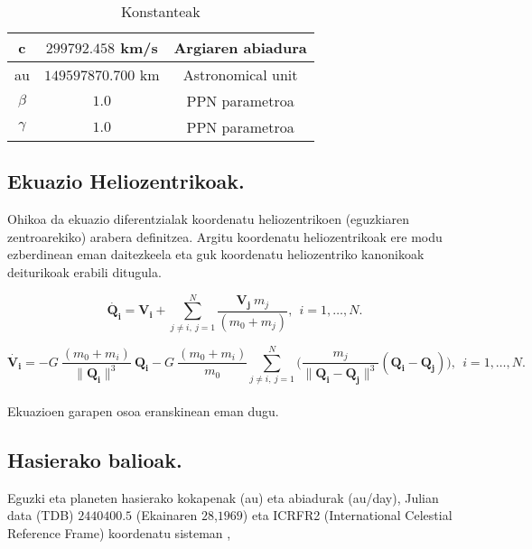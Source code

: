 \begin{table}[h]
\caption{Konstanteak}
\label{tab:1}       %
\centering
\begin{tabular}{ c c c }
\hline
  c             &  $299792.458$ km/s           & Argiaren abiadura  \\
\hline
  au            &  $149597870.700$ km           & Astronomical unit  \\
\hline 	       
$\beta$          & $1.0$                       & PPN parametroa     \\
\hline 
$\gamma$         & $1.0$                       & PPN parametroa     \\
\hline
\end{tabular}
\end{table}


\subsection{Ekuazio Heliozentrikoak.}

Ohikoa da ekuazio diferentzialak koordenatu heliozentrikoen (eguzkiaren zentroarekiko) arabera definitzea. Argitu koordenatu heliozentrikoak ere modu ezberdinean eman daitezkeela eta guk koordenatu heliozentriko kanonikoak deiturikoak erabili ditugula.

\begin{equation*}
\dot{\mathbf{Q_i}}=\mathbf{V_i}+ \sum\limits_{j\ne i,\ j=1}^{N} \frac{\mathbf{V_j} \ m_j}{(m_0+m_j)}, \ \ i=1,\dots, N.
\end{equation*}
   
\begin{equation*}
\dot{\mathbf{V_i}}=- G  \ \frac{(m_0+m_i)}{\|\mathbf{Q_i}\|^3 }\ \mathbf{Q_i}-G \ \frac{(m_0+m_i)}{m_0}
                    \sum\limits_{j \ne i , \ j=1}^{N} \bigg( \frac{m_j}{\|\mathbf{Q_i}-\mathbf{Q_j}\|^3} (\mathbf{Q_i-\mathbf{Q_j}})     \bigg), \ \ i=1,\dots, N.
\end{equation*}

\paragraph*{} Ekuazioen garapen osoa eranskinean eman dugu.

\subsection{Hasierako balioak.}

Eguzki eta planeten hasierako kokapenak (au) eta abiadurak (au/day), Julian data (TDB) $2440400.5$ (Ekainaren $28$,$1969$) eta ICRFR2 (International Celestial Reference Frame) koordenatu sisteman \cite{Folkner2014},

